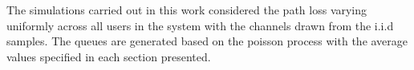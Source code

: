 
The simulations carried out in this work considered the path loss varying uniformly across all users in the system with the channels drawn from the i.i.d samples. The queues are generated based on the poisson process with the average values specified in each section presented. 